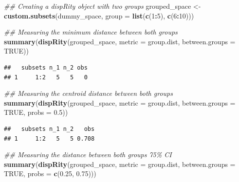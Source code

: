 \documentclass[
]{book}
\newenvironment{Shaded}{\begin{snugshade}}{\end{snugshade}}
\newcommand{\CommentTok}[1]{\textcolor[rgb]{0.56,0.35,0.01}{\textit{#1}}}
\newcommand{\DataTypeTok}[1]{\textcolor[rgb]{0.13,0.29,0.53}{#1}}
\newcommand{\DecValTok}[1]{\textcolor[rgb]{0.00,0.00,0.81}{#1}}
\newcommand{\FloatTok}[1]{\textcolor[rgb]{0.00,0.00,0.81}{#1}}
\newcommand{\KeywordTok}[1]{\textcolor[rgb]{0.13,0.29,0.53}{\textbf{#1}}}
\newcommand{\NormalTok}[1]{#1}
\newcommand{\OperatorTok}[1]{\textcolor[rgb]{0.81,0.36,0.00}{\textbf{#1}}}
\newcommand{\OtherTok}[1]{\textcolor[rgb]{0.56,0.35,0.01}{#1}}
\newcommand{\StringTok}[1]{\textcolor[rgb]{0.31,0.60,0.02}{#1}}
\begin{document}
\begin{Shaded}
\begin{Highlighting}[]
\CommentTok{\#\# Creating a dispRity object with two groups}
\NormalTok{grouped\_space \textless{}{-}}\StringTok{ }\KeywordTok{custom.subsets}\NormalTok{(dummy\_space,}
                      \DataTypeTok{group =} \KeywordTok{list}\NormalTok{(}\KeywordTok{c}\NormalTok{(}\DecValTok{1}\OperatorTok{:}\DecValTok{5}\NormalTok{), }\KeywordTok{c}\NormalTok{(}\DecValTok{6}\OperatorTok{:}\DecValTok{10}\NormalTok{)))}

\CommentTok{\#\# Measuring the minimum distance between both groups}
\KeywordTok{summary}\NormalTok{(}\KeywordTok{dispRity}\NormalTok{(grouped\_space, }\DataTypeTok{metric =}\NormalTok{ group.dist,}
                 \DataTypeTok{between.groups =} \OtherTok{TRUE}\NormalTok{))}
\end{Highlighting}
\end{Shaded}

\begin{verbatim}
##   subsets n_1 n_2 obs
## 1     1:2   5   5   0
\end{verbatim}

\begin{Shaded}
\begin{Highlighting}[]
\CommentTok{\#\# Measuring the centroid distance between both groups}
\KeywordTok{summary}\NormalTok{(}\KeywordTok{dispRity}\NormalTok{(grouped\_space, }\DataTypeTok{metric =}\NormalTok{ group.dist,}
                 \DataTypeTok{between.groups =} \OtherTok{TRUE}\NormalTok{, }\DataTypeTok{probs =} \FloatTok{0.5}\NormalTok{))}
\end{Highlighting}
\end{Shaded}

\begin{verbatim}
##   subsets n_1 n_2   obs
## 1     1:2   5   5 0.708
\end{verbatim}

\begin{Shaded}
\begin{Highlighting}[]
\CommentTok{\#\# Measuring the distance between both group\textquotesingle{}s 75\% CI}
\KeywordTok{summary}\NormalTok{(}\KeywordTok{dispRity}\NormalTok{(grouped\_space, }\DataTypeTok{metric =}\NormalTok{ group.dist,}
                 \DataTypeTok{between.groups =} \OtherTok{TRUE}\NormalTok{, }\DataTypeTok{probs =} \KeywordTok{c}\NormalTok{(}\FloatTok{0.25}\NormalTok{, }\FloatTok{0.75}\NormalTok{)))}
\end{Highlighting}
\end{Shaded}
\end{document}
